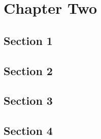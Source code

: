 \cleardoublepage %
\chapter{Chapter Two}

\section{Section 1}
\blindmathpaper
\section{Section 2}
\blindmathpaper
\section{Section 3}
\blindmathpaper
\section{Section 4}
\blindmathpaper